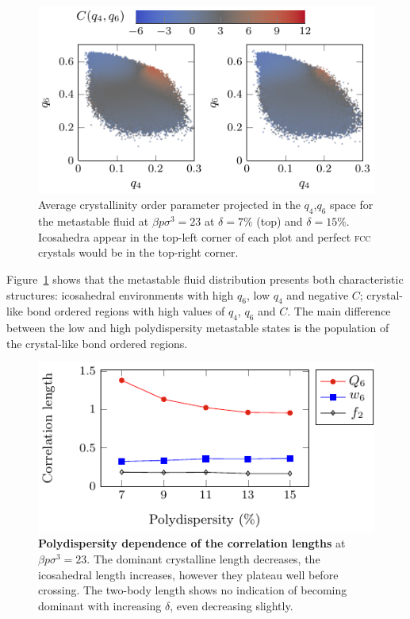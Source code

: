\documentclass[twocolumn,superscriptaddress]{revtex4-1}
\begin{document}
\begin{figure}
 \centering
 \includegraphics{fig_Cmaps}
 \caption{Average crystallinity order parameter projected in the $q_4$,$q_6$ space for the metastable fluid at $\beta p\sigma^3=23$ at $\delta=7\%$ (top) and $\delta=15\%$. Icosahedra appear in the top-left corner of each plot and perfect \textsc{fcc} crystals would be in the top-right corner.}
 \label{fig:Cmaps}
\end{figure}


Figure~\ref{fig:Cmaps} shows that the metastable fluid distribution presents both characteristic
structures: icosahedral environments with high $q_6$, low $q_4$ and negative $C$; crystal-like bond ordered regions with high values of
$q_4$, $q_6$ and $C$. The main difference between the low and
high polydispersity metastable states is the population of the crystal-like bond ordered regions.


\begin{figure}
 \centering
 \includegraphics{fig_lengthpoly}
	\caption{\textbf{Polydispersity dependence of the correlation lengths} at $\beta p\sigma^3=23$. The dominant crystalline length decreases, the icosahedral length increases, however they plateau well before crossing. The two-body length shows no indication of becoming dominant with increasing $\delta$, even decreasing slightly.}
	\label{fig:lengthpoly}
\end{figure}
\end{document}

